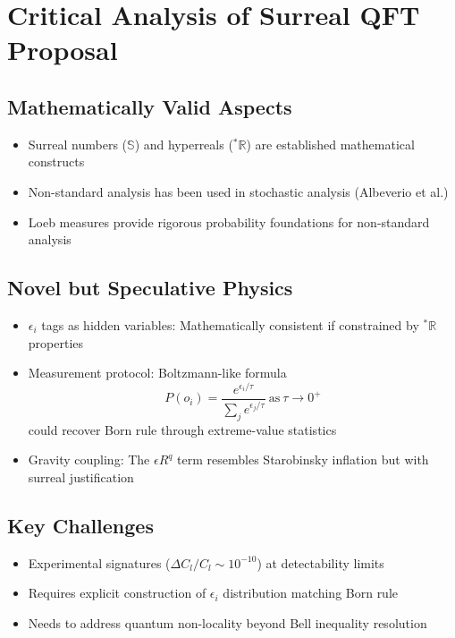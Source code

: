 \section*{Critical Analysis of Surreal QFT Proposal}

\subsection*{Mathematically Valid Aspects}
\begin{itemize}
\item Surreal numbers ($\mathbb{S}$) and hyperreals (${}^*\mathbb{R}$) are established mathematical constructs
\item Non-standard analysis has been used in stochastic analysis (Albeverio et al.)
\item Loeb measures provide rigorous probability foundations for non-standard analysis
\end{itemize}

\subsection*{Novel but Speculative Physics}
\begin{itemize}
\item $\epsilon_i$ tags as hidden variables: Mathematically consistent if constrained by ${}^*\mathbb{R}$ properties
\item Measurement protocol: Boltzmann-like formula
\begin{equation}
P(o_i) = \frac{e^{\epsilon_i/\tau}}{\sum_j e^{\epsilon_j/\tau}}\ \text{as}\ \tau\to 0^+
\end{equation}
could recover Born rule through extreme-value statistics
\item Gravity coupling: The $\epsilon R^q$ term resembles Starobinsky inflation but with surreal justification
\end{itemize}

\subsection*{Key Challenges}
\begin{itemize}
\item Experimental signatures ($\Delta C_l/C_l \sim 10^{-10}$) at detectability limits
\item Requires explicit construction of $\epsilon_i$ distribution matching Born rule
\item Needs to address quantum non-locality beyond Bell inequality resolution
\end{itemize}

